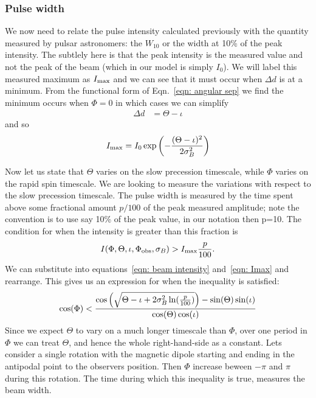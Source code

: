 \documentclass[/home/greg/Thesis/main/main.tex]{subfiles}
\begin{document}
\FloatBarrier
\subsubsection{Pulse width}
We now need to relate the pulse intensity calculated previously with the quantity
measured by pulsar astronomers: the $W_{10}$ or the width at 10\% of the peak
intensity. The subtlely here is that the peak intensity is the measured value
and not the peak of the beam (which in our model is simply  $I_0$). We will label
this measured maximum as $I_{\textrm{max}}$ and we can see that it must occur when $\Delta d$
is at a minimum. From the functional form of Eqn.~\eqref{eqn: angular sep} we
find the minimum occurs when $\Phi=0$ in which cases we can simplify
\begin{align}
\Delta d &= \Theta - \iota
\end{align}
and so
\begin{align}
I_{\textrm{max}} = I_{0} \exp\left(-\frac{(\Theta - \iota)^{2}}{2\sigma_{B}^{2}}\right)
\label{eqn: Imax}
\end{align}

Now let us state that $\Theta$ varies on the slow
precession timescale, while $\Phi$ varies on the rapid spin timescale. We are
looking to measure the variations with respect to the slow precession timescale.
The pulse width is measured by the time spent above some fractional amount $p/100$
of the peak measured amplitude; note the convention is to use say 10\% of the peak
value, in our notation then p=10. The condition for when the intensity is greater
than this fraction is
\begin{align}
I(\Phi, \Theta, \iota, \Phi_{\mathrm{obs}}, \sigma_{B}) > I_{\textrm{max}} \frac{p}{100}.
\end{align}
We can substitute into equations~\eqref{eqn: beam intensity} and~\eqref{eqn: Imax}
and rearrange. This gives us an expression for when the inequality is satisfied:
\begin{equation}
\cos(\Phi) < \frac{\cos\left(\sqrt{\Theta - \iota + 2\sigma_{B}^{2} \ln(\frac{p}{100})}\right) - \sin(\Theta)\sin(\iota)}
                          {\cos(\Theta)\cos(\iota)}
\label{eqn: 6737}
\end{equation}
Since we expect $\Theta$ to vary on a much longer timescale than $\Phi$, over 
one period in $\Phi$ we can treat $\Theta$, and hence the whole right-hand-side
as a constant. Lets consider a single rotation with the magnetic dipole
starting and ending in the antipodal point to the observers position. Then
$\Phi$ increase beween $-\pi$ and $\pi$ during this rotation. The
time during which this inequality is true, measures the beam width.
\end{document}
